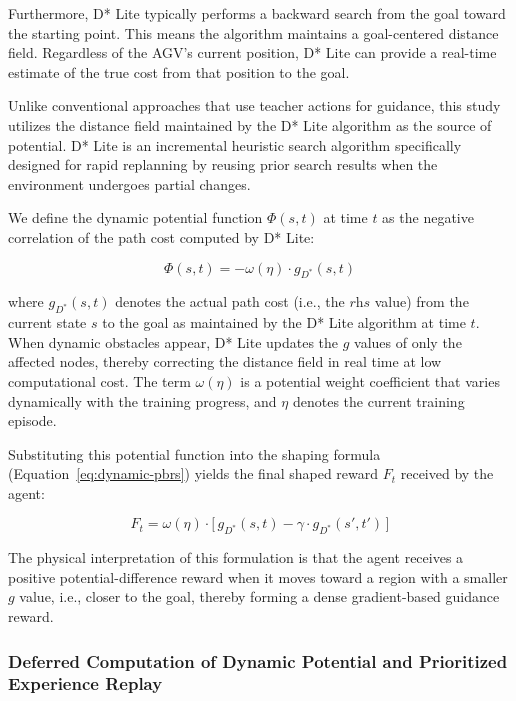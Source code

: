 Furthermore, D* Lite typically performs a backward search from the goal toward the starting point. This means the algorithm maintains a goal-centered distance field. Regardless of the AGV's current position, D* Lite can provide a real-time estimate of the true cost from that position to the goal.

Unlike conventional approaches that use teacher actions for guidance, this study utilizes the distance field maintained by the D* Lite algorithm as the source of potential. D* Lite is an incremental heuristic search algorithm specifically designed for rapid replanning by reusing prior search results when the environment undergoes partial changes.

We define the dynamic potential function $\Phi(s, t)$ at time $t$ as the negative correlation of the path cost computed by D* Lite:

\begin{equation}
\Phi(s, t) = -\omega(\eta) \cdot g_{D^{*}}(s, t) \label{eq:potential-dynamic}
\end{equation}

where $g_{D^{*}}(s, t)$ denotes the actual path cost (i.e., the $\textit{rhs}$ value) from the current state $s$ to the goal as maintained by the D* Lite algorithm at time $t$. When dynamic obstacles appear, D* Lite updates the $g$ values of only the affected nodes, thereby correcting the distance field in real time at low computational cost. The term $\omega(\eta)$ is a potential weight coefficient that varies dynamically with the training progress, and $\eta$ denotes the current training episode.

Substituting this potential function into the shaping formula (Equation~\eqref{eq:dynamic-pbrs}) yields the final shaped reward $F_t$ received by the agent:

\begin{equation}
F_t = \omega(\eta) \cdot \bigl[\, g_{D^{*}}(s, t) - \gamma \cdot g_{D^{*}}(s', t') \,\bigr] \label{eq:shaped-reward}
\end{equation}

The physical interpretation of this formulation is that the agent receives a positive potential-difference reward when it moves toward a region with a smaller $g$ value, i.e., closer to the goal, thereby forming a dense gradient-based guidance reward.

\subsubsection{Deferred Computation of Dynamic Potential and Prioritized Experience Replay}

